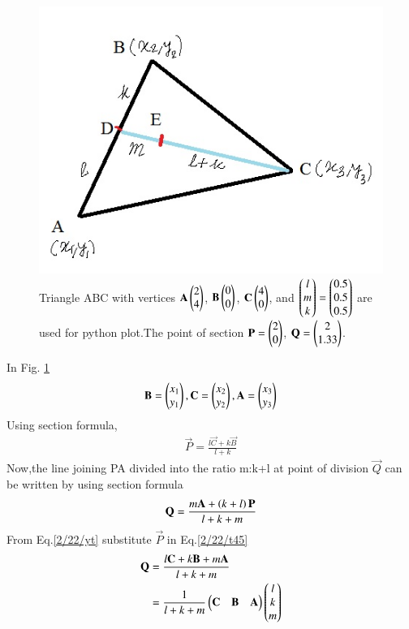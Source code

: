 \begin{figure}[h!]
       \centering
        \includegraphics[width =\linewidth]{solutions/2/22/assignment1.jpg}
        \caption{Triangle ABC with vertices $\mathbf{A}\begin{pmatrix}2\\4\end{pmatrix}$, $\mathbf{B}\begin{pmatrix}0\\0\end{pmatrix}$, $\mathbf{C}\begin{pmatrix}4\\0\end{pmatrix}$, and $\begin{pmatrix}l\\m\\k\end{pmatrix}=\begin{pmatrix}0.5\\0.5\\0.5\end{pmatrix}$ are used for python plot.The point of section $\mathbf{P}=\begin{pmatrix}2\\0\end{pmatrix}$, $\mathbf{Q}=\begin{pmatrix}2\\1.33\end{pmatrix}$.}\label{fig:2/22/t1}
\end{figure}
In  Fig. \ref{fig:2/22/t1}
\begin{align}
    \mathbf{B}=\begin{pmatrix}x_1\\y_1\end{pmatrix},
    \mathbf{C}=\begin{pmatrix}x_2\\y_2\end{pmatrix},
     \mathbf{A}=\begin{pmatrix}x_3\\y_3\end{pmatrix}
\end{align}
Using section formula,
\begin{align}
    \vec{P}=\frac{l\vec{C}+k\vec{B}}{l+k}\label{2/22/yt}
\end{align}
Now,the line joining PA divided into the ratio m:k+l at point of division $\vec{Q}$ can be written by using section formula 
\begin{align}
    \mathbf{Q}=\frac{m\mathbf{A}+\left(k+l\right)\mathbf{P}}{l+k+m}\label{2/22/t45}
\end{align}
From Eq.\eqref{2/22/yt} substitute $\vec{P}$ in Eq.\eqref{2/22/t45}
\begin{align}
    \mathbf{Q}&=\frac{l\mathbf{C}+k\mathbf{B}+m\mathbf{A}}{l+k+m} \\
    &=\frac{1}{l+k+m}\begin{pmatrix}\mathbf{C} & \mathbf{B} & \mathbf{A}\end{pmatrix}\begin{pmatrix}l\\k\\m\end{pmatrix}
\end{align}
